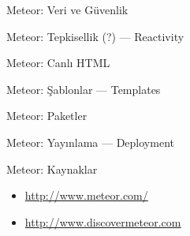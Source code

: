\documentclass{beamer}
\begin{document}
    \begin{frame}{Meteor: Veri ve G\"uvenlik}
    \end{frame}

    \begin{frame}{Meteor: Tepkisellik (?) --- Reactivity}
    \end{frame}

    \begin{frame}{Meteor: Canl{\i} HTML}
    \end{frame}

    \begin{frame}{Meteor: \c{S}ablonlar --- Templates}
    \end{frame}

    \begin{frame}{Meteor: Paketler}
    \end{frame}

    \begin{frame}{Meteor: Yay{\i}nlama --- Deployment}
    \end{frame}

    \begin{frame}{Meteor: Kaynaklar}
        \begin{itemize}
            \item \url{http://www.meteor.com/}
            \item \url{http://www.discovermeteor.com}
        \end{itemize}
    \end{frame}
\end{document}
